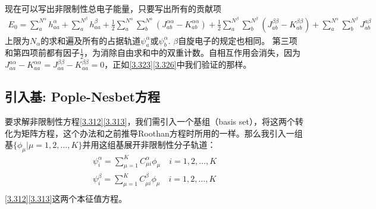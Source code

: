 现在可以写出非限制性总电子能量，只要写出所有的贡献项
\begin{align}
    E_{0}=\sum_{a}^{N^{\alpha}} h_{a a}^{\alpha}+\sum_{a}^{N^{\beta}} h_{a a}^{\beta}+\frac{1}{2} \sum_{a}^{N^{\alpha}} \sum_{b}^{N^{\alpha}}\left(J_{a b}^{\alpha \alpha}-K_{a b}^{\alpha \alpha}\right)+\frac{1}{2} \sum_{a}^{N^{\beta}} \sum_{b}^{N^{\beta}}\left(J_{a b}^{\beta \beta}-K_{a b}^{\beta \beta}\right)+\sum_{a}^{N^{\alpha}} \sum_{b}^{N^{\beta}} J_{a b}^{a \beta}
\end{align}
上限为$N_\alpha$的求和遍及所有的占据轨道$\psi_a^\alpha$或$\psi_b^\alpha$. $\beta$自旋电子的规定也相同。 第三项和第四项前都有因子$\frac{1}{2}$，为消除自由求和中的双重计数。自相互作用会消失，因为$J_{a a}^{a \alpha}-K_{a a}^{\alpha \alpha}=J_{a a}^{\beta \beta}-K_{a a}^{\beta \beta}=0$，正如\eqref{3.323}\eqref{3.326}中我们验证的那样。
\subsection{引入基: Pople-Nesbet方程}
要求解非限制性\hft 方程\eqref{3.312}\eqref{3.313}，我们需引入一个基组（basis set），将这两个转化为矩阵方程，这个办法和之前推导Roothan方程时所用的一样。那么我引入一组基$\{\phi_\mu|\mu = 1,2,\ldots,K\}$并用这组基展开非限制性分子轨道：
\begin{align}
    \psi_i^\alpha = \sum_{\mu=1}^K C_{\mu i}^\alpha \phi_\mu \quad i =1,2,\ldots,K \\
    \psi_i^\beta = \sum_{\mu=1}^K C_{\mu i}^\beta \phi_\mu \quad i =1,2,\ldots,K\\
\end{align}
\eqref{3.312}\eqref{3.313}这两个本征值方程。
